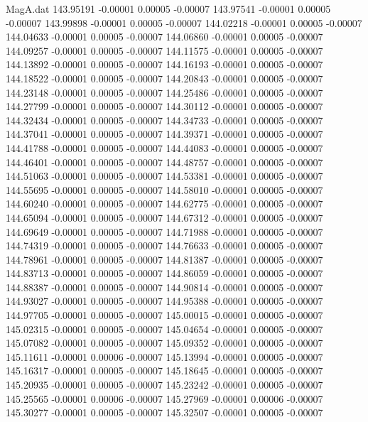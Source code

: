 \begin{filecontents}{MagA.dat}
 143.95191   -0.00001    0.00005   -0.00007
 143.97541   -0.00001    0.00005   -0.00007
 143.99898   -0.00001    0.00005   -0.00007
 144.02218   -0.00001    0.00005   -0.00007
 144.04633   -0.00001    0.00005   -0.00007
 144.06860   -0.00001    0.00005   -0.00007
 144.09257   -0.00001    0.00005   -0.00007
 144.11575   -0.00001    0.00005   -0.00007
 144.13892   -0.00001    0.00005   -0.00007
 144.16193   -0.00001    0.00005   -0.00007
 144.18522   -0.00001    0.00005   -0.00007
 144.20843   -0.00001    0.00005   -0.00007
 144.23148   -0.00001    0.00005   -0.00007
 144.25486   -0.00001    0.00005   -0.00007
 144.27799   -0.00001    0.00005   -0.00007
 144.30112   -0.00001    0.00005   -0.00007
 144.32434   -0.00001    0.00005   -0.00007
 144.34733   -0.00001    0.00005   -0.00007
 144.37041   -0.00001    0.00005   -0.00007
 144.39371   -0.00001    0.00005   -0.00007
 144.41788   -0.00001    0.00005   -0.00007
 144.44083   -0.00001    0.00005   -0.00007
 144.46401   -0.00001    0.00005   -0.00007
 144.48757   -0.00001    0.00005   -0.00007
 144.51063   -0.00001    0.00005   -0.00007
 144.53381   -0.00001    0.00005   -0.00007
 144.55695   -0.00001    0.00005   -0.00007
 144.58010   -0.00001    0.00005   -0.00007
 144.60240   -0.00001    0.00005   -0.00007
 144.62775   -0.00001    0.00005   -0.00007
 144.65094   -0.00001    0.00005   -0.00007
 144.67312   -0.00001    0.00005   -0.00007
 144.69649   -0.00001    0.00005   -0.00007
 144.71988   -0.00001    0.00005   -0.00007
 144.74319   -0.00001    0.00005   -0.00007
 144.76633   -0.00001    0.00005   -0.00007
 144.78961   -0.00001    0.00005   -0.00007
 144.81387   -0.00001    0.00005   -0.00007
 144.83713   -0.00001    0.00005   -0.00007
 144.86059   -0.00001    0.00005   -0.00007
 144.88387   -0.00001    0.00005   -0.00007
 144.90814   -0.00001    0.00005   -0.00007
 144.93027   -0.00001    0.00005   -0.00007
 144.95388   -0.00001    0.00005   -0.00007
 144.97705   -0.00001    0.00005   -0.00007
 145.00015   -0.00001    0.00005   -0.00007
 145.02315   -0.00001    0.00005   -0.00007
 145.04654   -0.00001    0.00005   -0.00007
 145.07082   -0.00001    0.00005   -0.00007
 145.09352   -0.00001    0.00005   -0.00007
 145.11611   -0.00001    0.00006   -0.00007
 145.13994   -0.00001    0.00005   -0.00007
 145.16317   -0.00001    0.00005   -0.00007
 145.18645   -0.00001    0.00005   -0.00007
 145.20935   -0.00001    0.00005   -0.00007
 145.23242   -0.00001    0.00005   -0.00007
 145.25565   -0.00001    0.00006   -0.00007
 145.27969   -0.00001    0.00006   -0.00007
 145.30277   -0.00001    0.00005   -0.00007
 145.32507   -0.00001    0.00005   -0.00007

\end{filecontents}
